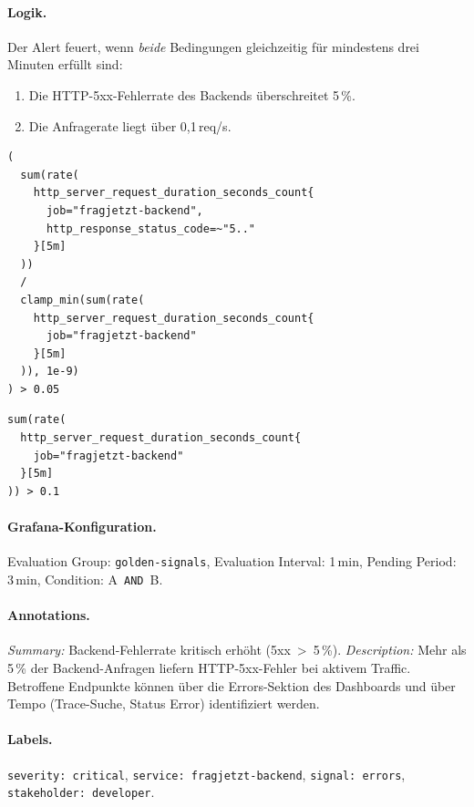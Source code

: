 \paragraph{Logik.}
Der Alert feuert, wenn \emph{beide} Bedingungen gleichzeitig für mindestens drei Minuten erfüllt sind:
\begin{enumerate}
  \item Die HTTP-5xx-Fehlerrate des Backends überschreitet 5\,\%.
  \item Die Anfragerate liegt über 0{,}1\,req/s.
\end{enumerate}

\begin{lstlisting}[style=bashstyle, numbers=none]
(
  sum(rate(
    http_server_request_duration_seconds_count{
      job="fragjetzt-backend",
      http_response_status_code=~"5.."
    }[5m]
  ))
  /
  clamp_min(sum(rate(
    http_server_request_duration_seconds_count{
      job="fragjetzt-backend"
    }[5m]
  )), 1e-9)
) > 0.05
\end{lstlisting}

\begin{lstlisting}[style=bashstyle, numbers=none]
sum(rate(
  http_server_request_duration_seconds_count{
    job="fragjetzt-backend"
  }[5m]
)) > 0.1
\end{lstlisting}

\paragraph{Grafana-Konfiguration.}
Evaluation Group: \texttt{golden-signals}, Evaluation Interval: 1\,min, Pending Period: 3\,min, Condition: A~\texttt{AND}~B.

\paragraph{Annotations.}
\emph{Summary:} Backend-Fehlerrate kritisch erhöht (5xx~>~5\,\%). \emph{Description:} Mehr als 5\,\% der Backend-Anfragen liefern HTTP-5xx-Fehler bei aktivem Traffic. Betroffene Endpunkte können über die Errors-Sektion des Dashboards und über Tempo (Trace-Suche, Status Error) identifiziert werden.

\paragraph{Labels.}
\texttt{severity: critical}, \texttt{service: fragjetzt-backend}, \texttt{signal: errors}, \texttt{stakeholder: developer}.


